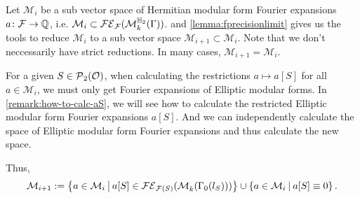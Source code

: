 \begin{remark}
\label{remark:algo-mainstep1}
Let $\mathcal{M}_i$ be a sub vector space of Hermitian modular form Fourier expansions $a \colon \mathcal{F} \rightarrow \mathbb{Q}$, i.e. $\mathcal{M}_i \subset \mathcal{FE}_{\mathcal{F}}(\operatorname{\mathcal{M}}^{\mathbb{H}_{2}}_{k} (\Gamma))$.
 and \cref{lemma:fprecisionlimit} gives us the tools to reduce $\mathcal{M}_i$ to a sub vector space $\mathcal{M}_{i+1} \subset \mathcal{M}_i$. Note that we don't neccessarily have strict reductions. In many cases, $\mathcal{M}_{i+1} = \mathcal{M}_i$.

For a given $S \in \operatorname{\mathcal{P}}_2(\mathcal{O})$, when calculating the restrictions $a \mapsto a[S]$ for all $a \in \mathcal{M}_i$, we must only get Fourier expansions of Elliptic modular forms.
In \cref{remark:how-to-calc-aS}, we will see how to calculate the restricted Elliptic modular form Fourier expansions $a[S]$.
And we can independently calculate the space of Elliptic modular form Fourier expansions and thus calculate the new space.

Thus,
\[  \mathcal{M}_{i+1} := \Set{a \in \mathcal{M}_i}{a[S] \in \FE_{\F(S)}(\ESpace{k}{\Gamma_0(l_S)})} \cup \Set{a \in \mathcal{M}_i}{a[S] \equiv 0}. \]
\end{remark}

